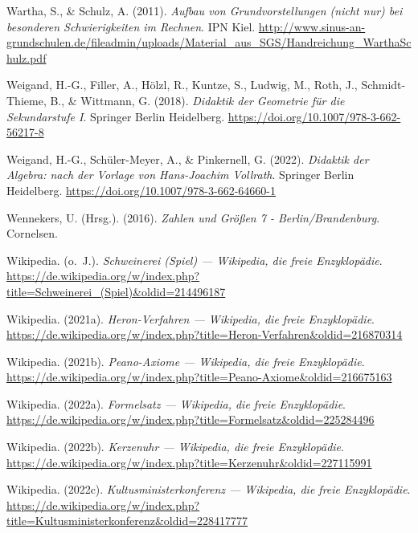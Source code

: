 \documentclass[
]{scrbook}
\newlength{\cslhangindent}
\newlength{\cslentryspacingunit} %
\newenvironment{CSLReferences}[2] %
 {%
  \setlength{\parindent}{0pt}
  \ifodd #1
  \let\oldpar\par
  \def\par{\hangindent=\cslhangindent\oldpar}
  \fi
  \setlength{\parskip}{#2\cslentryspacingunit}
 }%
 {}
\theoremstyle{definition}
\theoremstyle{definition}
\theoremstyle{definition}
\theoremstyle{definition}
\theoremstyle{remark}
\begin{document}
\begin{CSLReferences}{1}{0}
\leavevmode{}%
Wartha, S., \& Schulz, A. (2011). \emph{Aufbau von {Grundvorstellungen} (nicht nur) bei besonderen {Schwierigkeiten} im {Rechnen}}. IPN Kiel. \url{http://www.sinus-an-grundschulen.de/fileadmin/uploads/Material_aus_SGS/Handreichung_WarthaSchulz.pdf}

\leavevmode{}%
Weigand, H.-G., Filler, A., Hölzl, R., Kuntze, S., Ludwig, M., Roth, J., Schmidt-Thieme, B., \& Wittmann, G. (2018). \emph{Didaktik der {Geometrie} für die {Sekundarstufe} {I}}. Springer Berlin Heidelberg. \url{https://doi.org/10.1007/978-3-662-56217-8}

\leavevmode{}%
Weigand, H.-G., Schüler-Meyer, A., \& Pinkernell, G. (2022). \emph{Didaktik der {Algebra}: nach der {Vorlage} von {Hans}-{Joachim} {Vollrath}}. Springer Berlin Heidelberg. \url{https://doi.org/10.1007/978-3-662-64660-1}

\leavevmode{}%
Wennekers, U. (Hrsg.). (2016). \emph{Zahlen und {Größen} 7 - {Berlin}/{Brandenburg}}. Cornelsen.

\leavevmode{}%
Wikipedia. (o.~J.). \emph{Schweinerei (Spiel) --- Wikipedia{,} die freie Enzyklopädie}. \url{https://de.wikipedia.org/w/index.php?title=Schweinerei_(Spiel)\&oldid=214496187}

\leavevmode{}%
Wikipedia. (2021a). \emph{Heron-Verfahren --- Wikipedia{,} die freie Enzyklopädie}. \url{https://de.wikipedia.org/w/index.php?title=Heron-Verfahren\&oldid=216870314}

\leavevmode{}%
Wikipedia. (2021b). \emph{Peano-Axiome --- Wikipedia{,} die freie Enzyklopädie}. \url{https://de.wikipedia.org/w/index.php?title=Peano-Axiome\&oldid=216675163}

\leavevmode{}%
Wikipedia. (2022a). \emph{Formelsatz --- Wikipedia{,} die freie Enzyklopädie}. \url{https://de.wikipedia.org/w/index.php?title=Formelsatz\&oldid=225284496}

\leavevmode{}%
Wikipedia. (2022b). \emph{Kerzenuhr --- Wikipedia{,} die freie Enzyklopädie}. \url{https://de.wikipedia.org/w/index.php?title=Kerzenuhr\&oldid=227115991}

\leavevmode{}%
Wikipedia. (2022c). \emph{Kultusministerkonferenz --- Wikipedia{,} die freie Enzyklopädie}. \url{https://de.wikipedia.org/w/index.php?title=Kultusministerkonferenz\&oldid=228417777}


\end{CSLReferences}
\end{document}
